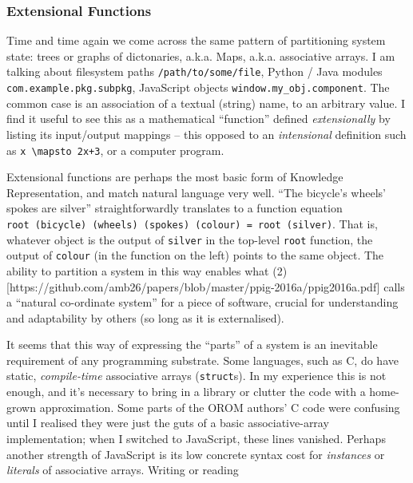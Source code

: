 \documentclass[english,submission]{programming}
\begin{document}
  \hypertarget{extensional-functions}{%
  \subsubsection{Extensional Functions}\label{extensional-functions}}

  Time and time again we come across the same pattern of partitioning
  system state: trees or graphs of dictonaries, a.k.a. Maps, a.k.a.
  associative arrays. I am talking about filesystem paths
  \texttt{/path/to/some/file}, Python / Java modules
  \texttt{com.example.pkg.subpkg}, JavaScript objects
  \texttt{window.my\_obj.component}. The common case is an association of
  a textual (string) name, to an arbitrary value. I find it useful to see
  this as a mathematical ``function'' defined \emph{extensionally} by
  listing its input/output mappings -- this opposed to an
  \emph{intensional} definition such as
  \texttt{x\ \textbackslash{}mapsto\ 2x+3}, or a computer program.

  Extensional functions are perhaps the most basic form of Knowledge
  Representation, and match natural language very well. ``The bicycle's
  wheels' spokes are silver'' straightforwardly translates to a function
  equation
  \texttt{root\ (bicycle)\ (wheels)\ (spokes)\ (colour)\ =\ root\ (silver)}.
  That is, whatever object is the output of \texttt{silver} in the
  top-level \texttt{root} function, the output of \texttt{colour} (in the
  function on the left) points to the same object. The ability to
  partition a system in this way enables what
  (2){[}https://github.com/amb26/papers/blob/master/ppig-2016a/ppig2016a.pdf{]}
  calls a ``natural co-ordinate system'' for a piece of software, crucial
  for understanding and adaptability by others (so long as it is
  externalised).

  It seems that this way of expressing the ``parts'' of a system is an
  inevitable requirement of any programming substrate. Some languages,
  such as C, do have static, \emph{compile-time} associative arrays
  (\texttt{struct}s). In my experience this is not enough, and it's
  necessary to bring in a library or clutter the code with a home-grown
  approximation. Some parts of the OROM authors' C code were confusing
  until I realised they were just the guts of a basic associative-array
  implementation; when I switched to JavaScript, these lines vanished.
  Perhaps another strength of JavaScript is its low concrete syntax cost
  for \emph{instances} or \emph{literals} of associative arrays. Writing
  or reading
\end{document}
